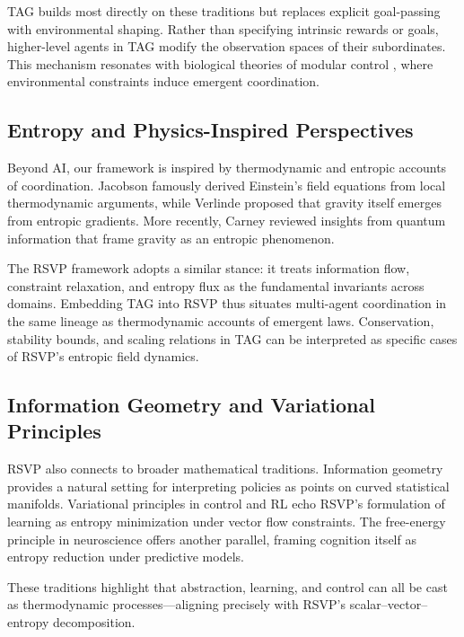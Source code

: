 \documentclass[11pt,a4paper]{article}
\begin{document}
TAG builds most directly on these traditions but replaces explicit goal-passing
with environmental shaping. Rather than specifying intrinsic rewards or goals,
higher-level agents in TAG modify the observation spaces of their subordinates.
This mechanism resonates with biological theories of modular control
\citep{levin2022tame}, where environmental constraints induce emergent
coordination.

\subsection{Entropy and Physics-Inspired Perspectives}

Beyond AI, our framework is inspired by thermodynamic and entropic accounts of
coordination. Jacobson \citep{jacobson1995thermodynamics} famously derived
Einstein’s field equations from local thermodynamic arguments, while Verlinde
\citep{verlinde2011origin} proposed that gravity itself emerges from entropic
gradients. More recently, Carney \citep{carney2022gravity} reviewed insights
from quantum information that frame gravity as an entropic phenomenon.

The RSVP framework adopts a similar stance: it treats information flow,
constraint relaxation, and entropy flux as the fundamental invariants across
domains. Embedding TAG into RSVP thus situates multi-agent coordination in the
same lineage as thermodynamic accounts of emergent laws. Conservation,
stability bounds, and scaling relations in TAG can be interpreted as specific
cases of RSVP’s entropic field dynamics.

\subsection{Information Geometry and Variational Principles}

RSVP also connects to broader mathematical traditions. Information geometry
\citep{amari2016information} provides a natural setting for interpreting
policies as points on curved statistical manifolds. Variational principles in
control and RL \citep{gallego2020variational} echo RSVP’s formulation of
learning as entropy minimization under vector flow constraints. The free-energy
principle in neuroscience \citep{friston2010free} offers another parallel,
framing cognition itself as entropy reduction under predictive models.

These traditions highlight that abstraction, learning, and control can all be
cast as thermodynamic processes—aligning precisely with RSVP’s scalar–vector–
entropy decomposition.
\end{document}
